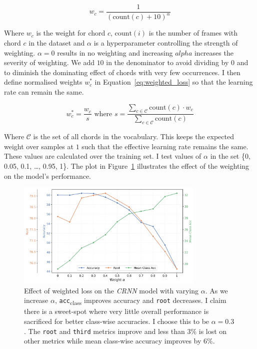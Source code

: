 \begin{equation}\label{eq:weighting}
    w_c = \frac{1}{{(\text{count}(c) + 10)}^\alpha}
\end{equation}

Where $w_c$ is the weight for chord $c$, $\text{count}(i)$ is the number of frames with chord $c$ in the dataset and $\alpha$ is a hyperparameter controlling the strength of weighting. $\alpha=0$ results in no weighting and increasing $alpha$ increases the severity of weighting. We add $10$ in the denominator to avoid dividing by $0$ and to diminish the dominating effect of chords with very few occurrences. I then define normalised weights $w_c^*$ in Equation~\ref{eq:weighted_loss} so that the learning rate can remain the same.

\begin{equation}\label{eq:weighted_loss}
    w_c^* = \frac{w_c}{s} \text{ where } s = \frac{\sum_{c\in \mathcal{C}} \text{count}(c)\cdot w_c}{\sum_{c\in \mathcal{C}} \text{count}(c)}
\end{equation}

Where $\mathcal{C}$ is the set of all chords in the vocabulary. This keeps the expected weight over samples at $1$ such that the effective learning rate remains the same. These values are calculated over the training set. I test values of $\alpha$ in the set \{0, 0.05, 0.1, \ldots, 0.95, 1\}. The plot in Figure~\ref{fig:weighted_loss} illustrates the effect of the weighting on the model's performance.

\begin{figure}[H]
    \centering
    \includegraphics[width=0.8\textwidth]{figures/weight_alpha_search_trim.png}
    \caption{Effect of weighted loss on the \emph{CRNN} model with varying $\alpha$. As we increase $\alpha$, \texttt{acc}\textsubscript{class} improves accuracy and \texttt{root} decreases. I claim there is a sweet-spot where very little overall performance is sacrificed for better class-wise accuracies. I choose this to be $\alpha = 0.3$. The \texttt{root} and \texttt{third} metrics improve and less than $3\%$ is lost on other metrics while mean class-wise accuracy improves by $6\%$.}\label{fig:weighted_loss}
\end{figure}

